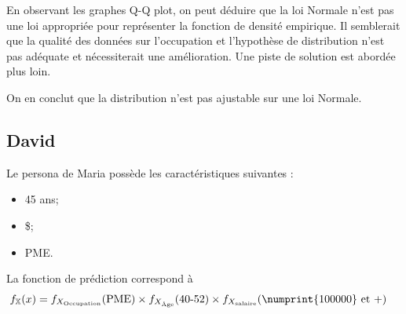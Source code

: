 \documentclass[11pt,french]{article}\usepackage[]{graphicx}\usepackage[]{color}
\begin{document}
En observant les graphes Q-Q plot, on peut déduire que la loi Normale n'est pas une loi appropriée pour représenter la fonction de densité empirique. Il semblerait que la qualité des données sur l'occupation et l'hypothèse de distribution n'est pas adéquate et nécessiterait une amélioration. Une piste de solution est abordée plus loin.

On en conclut que la distribution n'est pas ajustable sur une loi Normale.

\subsection{David}
Le persona de Maria possède les caractéristiques suivantes : 
\begin{itemize}
\item 45 ans;
\item{} \$;
\item PME.
\end{itemize}
La fonction de prédiction correspond à
\begin{align*}
f_{\mathbb{X}}(x) &= f_{X_{\text{Occupation}}}(\text{PME}) \times f_{X_{\text{Âge}}}(\text{40-52}) \times f_{X_{\text{salaire}}}(\text{\numprint{100000} et +})
\end{align*}
\end{document}
